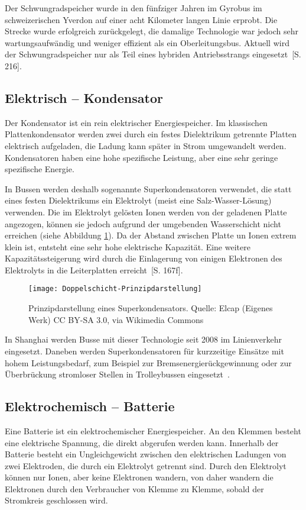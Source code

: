 Der Schwungradspeicher wurde in den fünfziger Jahren im Gyrobus im schweizerischen Yverdon auf einer acht Kilometer langen Linie erprobt. Die Strecke wurde erfolgreich zurückgelegt, die damalige Technologie war jedoch sehr wartungsaufwändig und weniger effizient als ein Oberleitungsbus. Aktuell wird der Schwungradspeicher nur als Teil eines hybriden Antriebsstrangs eingesetzt~\cite{tub_aleph001746639}[S. 216].

\subsection{Elektrisch – Kondensator}
Der Kondensator ist ein rein elektrischer Energiespeicher. Im klassischen Plattenkondensator werden zwei durch ein festes Dielektrikum getrennte Platten elektrisch aufgeladen, die Ladung kann später in Strom umgewandelt werden. Kondensatoren haben eine hohe spezifische Leistung, aber eine sehr geringe spezifische Energie.

In Bussen werden deshalb sogenannte Superkondensatoren verwendet, die statt eines festen Dielektrikums ein Elektrolyt (meist eine Salz-Wasser-Lösung) verwenden. Die im Elektrolyt gelösten Ionen werden von der geladenen Platte angezogen, können sie jedoch aufgrund der umgebenden Wasserschicht nicht erreichen (siehe Abbildung \ref{abb_doppelschicht}). Da der Abstand zwischen Platte un Ionen extrem klein ist, entsteht eine sehr hohe elektrische Kapazität. Eine weitere Kapazitätssteigerung wird durch die Einlagerung von einigen Elektronen des Elektrolyts in die Leiterplatten erreicht~\cite{Sterner:2014}[S. 167f].

\begin{figure}\centering
	\texttt{[image: Doppelschicht-Prinzipdarstellung]}
	\caption[Prinzipdarstellung eines Superkondensators]{Prinzipdarstellung eines Superkondensators. Quelle: Elcap (Eigenes Werk) CC BY-SA 3.0, via Wikimedia Commons}
	\label{abb_doppelschicht}
\end{figure}

In Shanghai werden Busse mit dieser Technologie seit 2008 im Linienverkehr eingesetzt. Daneben werden Superkondensatoren für kurzzeitige Einsätze mit hohem Leistungsbedarf, zum Beispiel zur Bremsenergierückgewinnung oder zur Überbrückung stromloser Stellen in Trolleybussen eingesetzt~\cite{Barminer-Busgesellschaft:2012}.

\subsection{Elektrochemisch – Batterie} %
Eine Batterie ist ein elektrochemischer Energiespeicher. An den Klemmen besteht eine elektrische Spannung, die direkt abgerufen werden kann. Innerhalb der Batterie besteht ein Ungleichgewicht zwischen den elektrischen Ladungen von zwei Elektroden, die durch ein Elektrolyt getrennt sind. Durch den Elektrolyt können nur Ionen, aber keine Elektronen wandern, von daher wandern die Elektronen durch den Verbraucher von Klemme zu Klemme, sobald der Stromkreis geschlossen wird.

